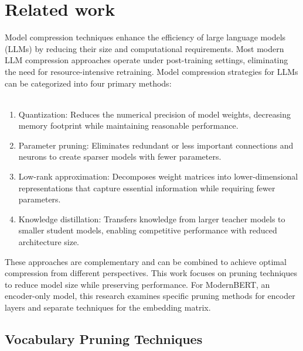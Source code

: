 \documentclass[twocolumn]{article}
\begin{document}
\section{Related work}
Model compression techniques enhance the efficiency of large language models (LLMs) by reducing their size and computational requirements. Most modern LLM compression approaches operate under post-training settings, eliminating the need for resource-intensive retraining. Model compression strategies for LLMs can be categorized into four primary methods:
\\ \\
\begin{enumerate}
    \item Quantization: Reduces the numerical precision of model weights, decreasing memory footprint while maintaining reasonable performance.
    
    \item Parameter pruning: Eliminates redundant or less important connections and neurons to create sparser models with fewer parameters.
    
    \item Low-rank approximation: Decomposes weight matrices into lower-dimensional representations that capture essential information while requiring fewer parameters.
    
    \item Knowledge distillation: Transfers knowledge from larger teacher models to smaller student models, enabling competitive performance with reduced architecture size.
\end{enumerate}
These approaches are complementary and can be combined to achieve optimal compression from different perspectives. 
This work focuses on pruning techniques to reduce model size while preserving performance.
For ModernBERT, an encoder-only model, this research examines specific pruning methods for encoder layers and separate techniques for the embedding matrix.

\subsection{Vocabulary Pruning Techniques}
\end{document}
